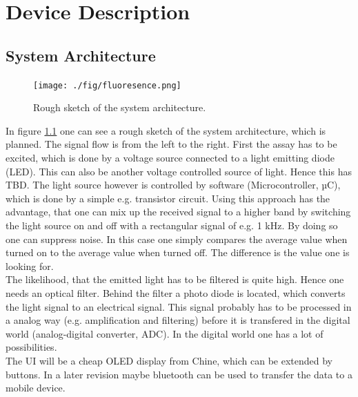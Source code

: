 \documentclass{report}
\newcommand{\newpar}{\vspace{1em}\\}
\begin{document}



\pagestyle{fancy}

\tableofcontents
\listoffigures
\newpage
\listoftables

\newpage
\setcounter{roman}{\value{page}}
\setcounter{page}{1}

\chapter{Device Description}
\section{System Architecture}
\begin{figure}[H]
	\texttt{[image: ./fig/fluoresence.png]}
	\caption{Rough sketch of the system architecture.}
	\label{fig:block}
\end{figure}
In figure \ref{fig:block} one can see a rough sketch of the system architecture, which is planned. The signal flow is from the left to the right. First the assay has to be excited, which is done by a voltage source connected to a light emitting diode (LED). This can also be another voltage controlled source of light. Hence this has TBD. The light source however is controlled by software (Microcontroller, µC), which is done by a simple e.g. transistor circuit. Using this approach has the advantage, that one can mix up the received signal to a higher band by switching the light source on and off with a rectangular signal of e.g. 1 kHz. By doing so one can suppress noise. In this case one simply compares the average value when turned on to the average value when turned off. The difference is the value one is looking for.  
\newpar
The likelihood, that the emitted light has to be filtered is quite high. Hence one needs an optical filter. Behind the filter a photo diode is located, which converts the light signal to an electrical signal. This signal probably has to be processed in a analog way (e.g. amplification and filtering) before it is transfered in the digital world (analog-digital converter, ADC). In the digital world one has a lot of possibilities. 
\newpar
The UI will be a cheap OLED display from Chine, which can be extended by buttons. In a later revision maybe bluetooth can be used to transfer the data to a mobile device.     
\end{document}

